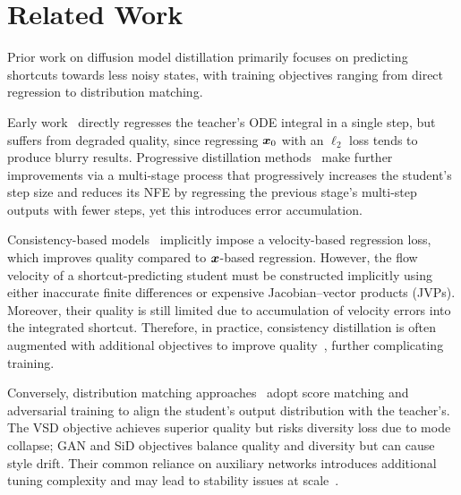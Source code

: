 \section{Related Work}
Prior work on diffusion model distillation primarily focuses on predicting shortcuts towards less noisy states, with training objectives ranging from direct regression to distribution matching.

Early work~\citep{luhman2021knowledgedistillationiterativegenerative} directly regresses the teacher's ODE integral in a single step, but suffers from degraded quality, since regressing ${\bm{x}}_0$ with an $\ell_2$ loss tends to produce blurry results. Progressive distillation methods~\citep{salimans2022progressive,liu2022flow,instaflow,frans2025one} make further improvements via a multi-stage process that progressively increases the student's step size and reduces its NFE by regressing the previous stage's multi-step outputs with fewer steps, yet this introduces error accumulation.

Consistency-based models~\citep{consistencymodels,boot,kim2024consistency,song2024improved,meanflow,boffi2025flow} implicitly impose a velocity-based regression loss, which improves quality compared to ${\bm{x}}$-based regression. However, the flow velocity of a shortcut-predicting student must be constructed implicitly using either inaccurate finite differences or expensive Jacobian--vector products (JVPs). Moreover, their quality is still limited due to accumulation of velocity errors into the integrated shortcut. Therefore, in practice, consistency distillation is often augmented with additional objectives to improve quality~\citep{hypersd,zheng2025largescalediffusiondistillation}, further complicating training.

Conversely, distribution matching approaches~\citep{yin2024onestep,yin2024improved,sauer2025adversarial,sid,sim,salimans2024multistep,imm} adopt score matching and adversarial training to align the student's output distribution with the teacher's. The VSD objective achieves superior quality but risks diversity loss due to mode collapse; GAN and SiD objectives balance quality and diversity but can cause style drift. Their common reliance on auxiliary networks introduces additional tuning complexity and may lead to stability issues at scale~\citep{senseflow}.